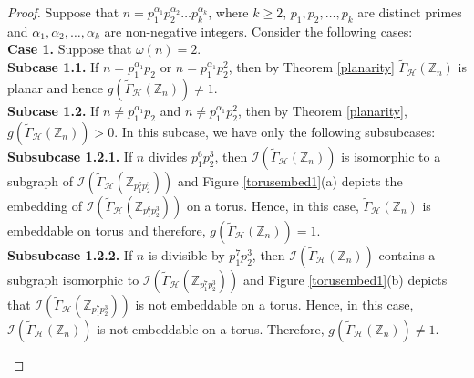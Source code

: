\documentclass[11pt,a4paper]{article}
\theoremstyle{definition}
\theoremstyle{remark}
\begin{document}
\begin{proof} 	
	Suppose that  $n=p_1^{\alpha_1}p_2^{\alpha_2}\ldots p_k^{\alpha_k}$, where  $k \geq 2$, $p_1,p_2, \ldots, p_k$ are distinct primes and $\alpha_1, \alpha_2, \ldots, \alpha_k$ are non-negative integers. 
	Consider the following cases:\\
	\textbf{Case 1.} Suppose that $\omega(n) =2$.\\
	\textbf{Subcase 1.1.} If $n=p_1^{\alpha_1}p_2$ or $n=p_1^{\alpha_1}p_2^2$, then by Theorem \ref{planarity} $\tilde{\Gamma}_\mathcal{H}(\mathbb{Z}_n)$ is planar and hence $g(\tilde{\Gamma}_\mathcal{H}(\mathbb{Z}_n)) \neq 1$. \\
	\textbf{Subcase 1.2.} If $n \neq p_1^{\alpha_1}p_2$ and $n \neq p_1^{\alpha_1}p_2^2$, then by Theorem \ref{planarity}, $g(\tilde{\Gamma}_\mathcal{H}(\mathbb{Z}_n))> 0$. In this subcase, we have only the following subsubcases:\\
	\textbf{Subsubcase 1.2.1.} If $n$ divides $p_1^6 p_2^3$, then  $\mathcal{I}(\tilde{\Gamma}_\mathcal{H}(\mathbb{Z}_n))$ is isomorphic to a subgraph of $\mathcal{I}(\tilde{\Gamma}_\mathcal{H}(\mathbb{Z}_{p_1^6p_2^3}))$ and  Figure \ref{torusembed1}(a) depicts the embedding of $\mathcal{I}(\tilde{\Gamma}_\mathcal{H}(\mathbb{Z}_{p_1^6p_2^3}))$ on a torus.  Hence, in this case, $\tilde{\Gamma}_\mathcal{H}(\mathbb{Z}_n)$ is embeddable on torus and therefore, $g(\tilde{\Gamma}_\mathcal{H}(\mathbb{Z}_n)) =1$.\\ 
	\noindent \textbf{Subsubcase 1.2.2.} If $n$ is divisible by $p_1^7p_2^3$, then $\mathcal{I}(\tilde{\Gamma}_\mathcal{H}(\mathbb{Z}_n))$ contains a subgraph isomorphic to  $\mathcal{I}(\tilde{\Gamma}_\mathcal{H}(\mathbb{Z}_{p_1^7p_2^3}))$ and Figure \ref{torusembed1}(b) depicts that   $\mathcal{I}(\tilde{\Gamma}_\mathcal{H}(\mathbb{Z}_{p_1^7p_2^3}))$ is not embeddable on a torus. Hence, in this case,  $\mathcal{I}(\tilde{\Gamma}_\mathcal{H}(\mathbb{Z}_n))$ is not embeddable on a torus. Therefore, $g(\tilde{\Gamma}_\mathcal{H}(\mathbb{Z}_n)) \neq 1$.	\begin{figure}[htbp!]
		\centering
		
\end{figure}
\end{proof}
\end{document}
